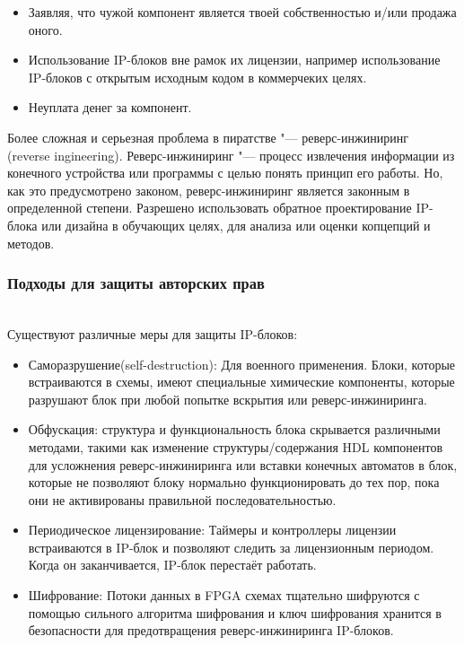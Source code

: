 \begin{itemize}
  \item Заявляя, что чужой компонент является твоей собственностью и/или продажа оного.
  \item Использование IP-блоков вне рамок их лицензии, например использование IP-блоков с открытым исходным кодом в коммерчеких целях.
  \item Неуплата денег за компонент.
\end{itemize}

Более сложная и серьезная проблема в пиратстве "--- реверс-инжиниринг\\(reverse ingineering). Реверс-инжиниринг "--- процесс извлечения информации из конечного устройства или программы с целью понять принцип его работы. Но, как это предусмотрено законом, реверс-инжиниринг является законным в определенной степени. Разрешено использовать обратное проектирование IP-блока  или дизайна в обучающих целях, для анализа или оценки копцепций и методов.

\subsubsection{Подходы для защиты авторских прав}~\\
\label{page:domain:secure_approaches}
Существуют различные меры для защиты IP-блоков:

\begin{itemize}
\item Саморазрушение(self-destruction): Для военного применения. Блоки, которые встраиваются в схемы, имеют специальные химические компоненты, которые разрушают блок при любой попытке вскрытия или реверс-инжиниринга.
\item Обфускация: структура и функциональность блока скрывается\cite{obfuscation_soc_design} различными методами, такими как изменение структуры/содержания HDL компонентов для усложнения реверс-инжиниринга\cite{obf_as_int_rights_prot_in_vhdl} или вставки конечных автоматов  в блок, которые не позволяют блоку нормально функционировать до тех пор, пока они не активированы правильной последовательностью\cite{rtl_hardware_ip_protection}.
\item Периодическое лицензирование: Таймеры и контроллеры лицензии встраиваются в IP-блок и позволяют следить за лицензионным периодом. Когда он заканчивается, IP-блок перестаёт работать.
\item Шифрование: Потоки данных в FPGA схемах тщательно шифруются с помощью сильного алгоритма шифрования и ключ шифрования хранится в безопасности для предотвращения реверс-инжиниринга IP-блоков.
\end{itemize}

